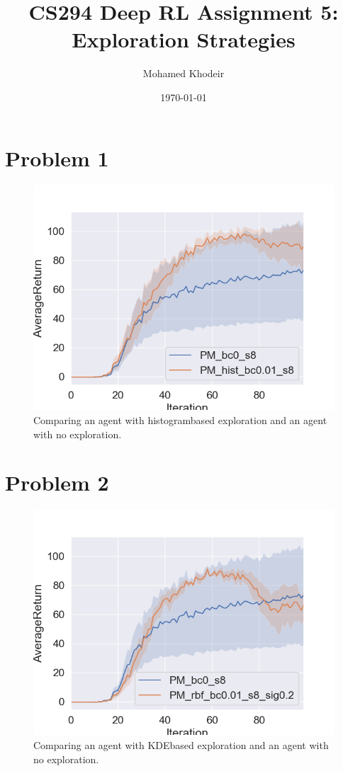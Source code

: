 \documentclass[a4paper]{article}
\title{CS294 Deep RL Assignment 5: Exploration Strategies}
\author{Mohamed Khodeir}
\date{\today}
\begin{document}
\maketitle


\section*{Problem 1}
\begin{figure}[H]
\centering
\includegraphics[width=1\textwidth]{p1.png}
\caption{Comparing an agent with histogrambased exploration and an agent with no exploration.}
\end{figure}

\pagebreak

\section*{Problem 2}
\begin{figure}[H]
\centering
\includegraphics[width=1\textwidth]{p2.png}
\caption{Comparing an agent with KDEbased exploration and an agent with no exploration.}
\end{figure}
\end{document}
